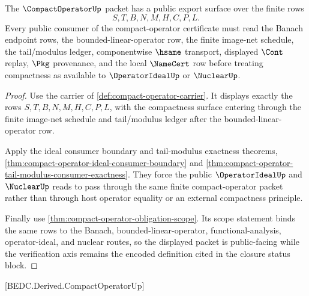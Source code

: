 \begin{theorem}
\label{thm:compact-operator-public-export-status}
The $\CompactOperatorUp$ packet has a public export surface over the finite rows
$$
S,T,B,N,M,H,C,P,L .
$$
Every public consumer of the compact-operator certificate must read the Banach endpoint rows, the bounded-linear-operator row, the finite image-net schedule, the tail/modulus ledger, componentwise $\hsame$ transport, displayed $\Cont$ replay, $\Pkg$ provenance, and the local $\NameCert$ row before treating compactness as available to $\OperatorIdealUp$ or $\NuclearUp$.
\end{theorem}
\begin{proof}
Use the carrier of \autoref{def:compact-operator-carrier}. It displays exactly the rows $S,T,B,N,M,H,C,P,L$, with the compactness surface entering through the finite image-net schedule and tail/modulus ledger after the bounded-linear-operator row.

Apply the ideal consumer boundary and tail-modulus exactness theorems, \autoref{thm:compact-operator-ideal-consumer-boundary} and \autoref{thm:compact-operator-tail-modulus-consumer-exactness}. They force the public $\OperatorIdealUp$ and $\NuclearUp$ reads to pass through the same finite compact-operator packet rather than through host operator equality or an external compactness principle.

Finally use \autoref{thm:compact-operator-obligation-scope}. Its scope statement binds the same rows to the Banach, bounded-linear-operator, functional-analysis, operator-ideal, and nuclear routes, so the displayed packet is public-facing while the verification axis remains the encoded definition cited in the closure status block.
\end{proof}

[BEDC.Derived.CompactOperatorUp]

\begin{closurestatus}{\CompactOperatorUp}
  \theoryclosure{\matureClosure}
  \formalstatus{\encodedDefV}
\end{closurestatus}
